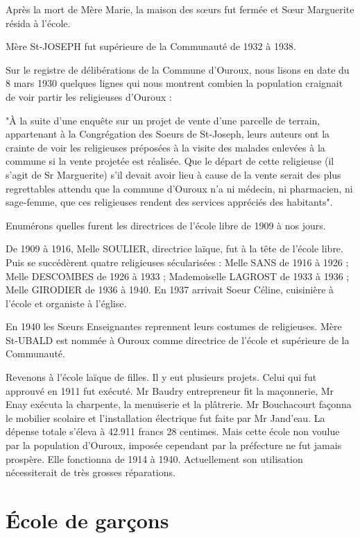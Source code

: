 Après la mort de Mère Marie, la maison des sœurs fut fermée et Sœur Marguerite résida à l'école.

Mère St-JOSEPH fut supérieure de la Communauté de 1932 à 1938.

Sur le registre de délibérations de la Commune d'Ouroux, nous lisons en date du 8 mars 1930 quelques lignes qui nous montrent combien la population craignait de voir partir les religieuses d'Ouroux :

"À la suite d'une enquête sur un projet de vente d'une parcelle de terrain, appartenant à la Congrégation des Soeurs de St-Joseph, leurs auteurs ont la crainte de voir les religieuses préposées à la visite des malades enlevées à la commune si la vente projetée est réalisée. Que le départ de cette religieuse (il s'agit de Sr Marguerite) s'il devait avoir lieu à cause de la vente serait des plus regrettables attendu que la commune d'Ouroux n'a ni médecin, ni pharmacien, ni sage-femme, que ces religieuses rendent des services appréciés des habitants".

Enumérons quelles furent les directrices de l'école libre de 1909 à nos jours.

De 1909 à 1916, Melle SOULIER, directrice laïque, fut à la tête de l'école libre. Puis se succédèrent quatre religieuses sécularisées : Melle SANS de 1916 à 1926 ; Melle DESCOMBES de 1926 à 1933 ; Mademoiselle LAGROST de 1933 à 1936 ; Melle GIRODIER de 1936 à 1940. En 1937 arrivait Soeur Céline, cuisinière à l'école et organiste à l'église.

En 1940 les Sœurs Enseignantes reprennent leurs costumes de religieuses. Mère St-UBALD est nommée à Ouroux comme directrice de l'école et supérieure de la Communauté.

Revenons à l'école laïque de filles. Il y eut plusieurs projets. Celui qui fut approuvé en 1911 fut exécuté. Mr Baudry entrepreneur fit la maçonnerie, Mr Enay exécuta la charpente, la menuiserie et la plâtrerie. Mr Bouchacourt façonna le mobilier scolaire et l'installation électrique fut faite par Mr Jand'eau. La dépense totale s'éleva à 42.911 francs 28 centimes. Mais cette école non voulue par la population d'Ouroux, imposée cependant par la préfecture ne fut jamais prospère. Elle fonctionna de 1914 à 1940. Actuellement son utilisation nécessiterait de très grosses réparations.

\section*{École de garçons}

